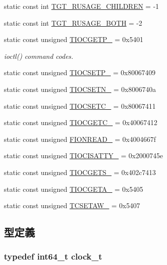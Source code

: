 \begin{DoxyCompactItemize}
static const int \hyperlink{classArmLinux64_a9a340e7463be441b8aeb8ea0a109e1bc}{TGT\_\-RUSAGE\_\-CHILDREN} = -\/1
\item 
static const int \hyperlink{classArmLinux64_af555fb2e49227259e6f6a78e2f6996e4}{TGT\_\-RUSAGE\_\-BOTH} = -\/2
\item 
static const unsigned \hyperlink{classArmLinux64_a7ab31748d0ee4ff17de14aff6476785d}{TIOCGETP\_\-} = 0x5401
\begin{DoxyCompactList}\small\item\em ioctl() command codes. \item\end{DoxyCompactList}\item 
static const unsigned \hyperlink{classArmLinux64_a5d98a22b7e576eab9eb1b411fcb7b63a}{TIOCSETP\_\-} = 0x80067409
\item 
static const unsigned \hyperlink{classArmLinux64_a3a5429d636a6a5c2b15d98808bdd1413}{TIOCSETN\_\-} = 0x8006740a
\item 
static const unsigned \hyperlink{classArmLinux64_a22e252d8cd6a0b19c915466d0da5edea}{TIOCSETC\_\-} = 0x80067411
\item 
static const unsigned \hyperlink{classArmLinux64_aad5ef7742595f935f5d33b46238c8b90}{TIOCGETC\_\-} = 0x40067412
\item 
static const unsigned \hyperlink{classArmLinux64_a79036fcad746cd14c507991b1745526c}{FIONREAD\_\-} = 0x4004667f
\item 
static const unsigned \hyperlink{classArmLinux64_a2957a5262d4c98a0048b38a33c7094db}{TIOCISATTY\_\-} = 0x2000745e
\item 
static const unsigned \hyperlink{classArmLinux64_a5beed2064338286f4e02590b76b2ffde}{TIOCGETS\_\-} = 0x402c7413
\item 
static const unsigned \hyperlink{classArmLinux64_a5e6352f7b3493d60efab0e811b9f23be}{TIOCGETA\_\-} = 0x5405
\item 
static const unsigned \hyperlink{classArmLinux64_a81c076b60e8728fd6d28a5ea28b6731e}{TCSETAW\_\-} = 0x5407
\end{DoxyCompactItemize}


\subsection{型定義}
\hypertarget{classArmLinux64_a0001c50514d27f51d408e051dc803ad4}{
\subsubsection[{clock\_\-t}]{\setlength{\rightskip}{0pt plus 5cm}typedef int64\_\-t {\bf clock\_\-t}}}
\label{classArmLinux64_a0001c50514d27f51d408e051dc803ad4}


